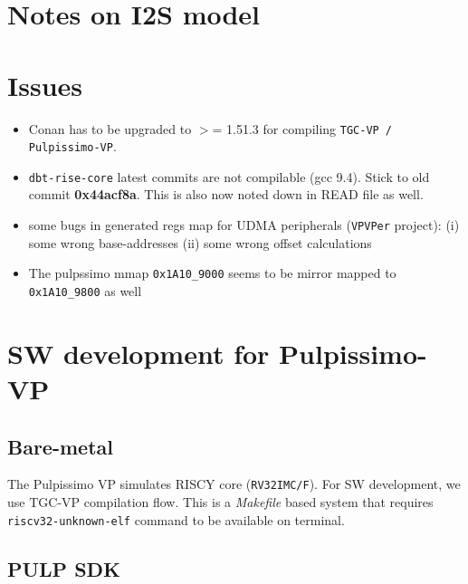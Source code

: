\documentclass{article}
\begin{document}
\section{Notes on I2S model}

\section{Issues}
\begin{itemize}
 \item Conan has to be upgraded to $>$= 1.51.3 for compiling \texttt{TGC-VP / Pulpissimo-VP}.
 \item \texttt{dbt-rise-core} latest commits are not compilable (gcc 9.4). Stick to old commit \textbf{0x44acf8a}.
       This is also now noted down in READ file as well.
 \item some bugs in generated regs map for UDMA peripherals (\texttt{VPVPer} project):
       (i) some wrong base-addresses (ii) some wrong offset calculations
 \item The pulpssimo mmap \texttt{0x1A10\_9000} seems to be mirror mapped to \texttt{0x1A10\_9800} as well
\end{itemize}

\section{SW development for Pulpissimo-VP}
\subsection{Bare-metal}
The Pulpissimo VP simulates RISCY core (\texttt{RV32IMC/F}). For SW development, we use
TGC-VP compilation flow. This is a \textit{Makefile} based system that requires \texttt{riscv32-unknown-elf}
command to be available on terminal.

\subsection{PULP SDK}

\newpage
\end{document}
